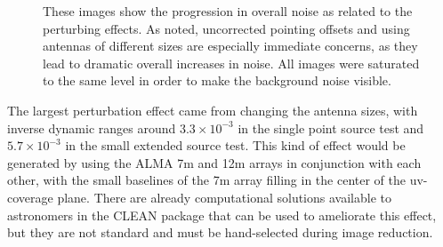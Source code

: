 \documentclass[11pt]{article}
\begin{document}
\begin{figure}
{        \label{fig:pointing}
    }
    \quad
    \quad
    \caption{
        These images show the progression in overall noise as related to the 
        perturbing effects. As noted, uncorrected pointing offsets and using 
        antennas of different sizes are especially immediate concerns, as they 
        lead to dramatic overall increases in noise. All images were saturated 
        to the same level in order to make the background noise visible.
    }
    \label{fig:perturbations}
\end{figure}

The largest perturbation effect came from changing the antenna sizes, with 
inverse dynamic ranges around $ 3.3 \times 10^{-3}$ in the single point source 
test and $5.7 \times 10^{-3}$ in the small extended source test. This kind of 
effect would be generated by using the ALMA 7m and 12m arrays in conjunction 
with each other, with the small baselines of the 7m array filling in the center 
of the uv-coverage plane. There are already computational solutions available 
to astronomers in the CLEAN package that can be used to ameliorate this effect, 
but they are not standard and must be hand-selected during image reduction.
\end{document}

